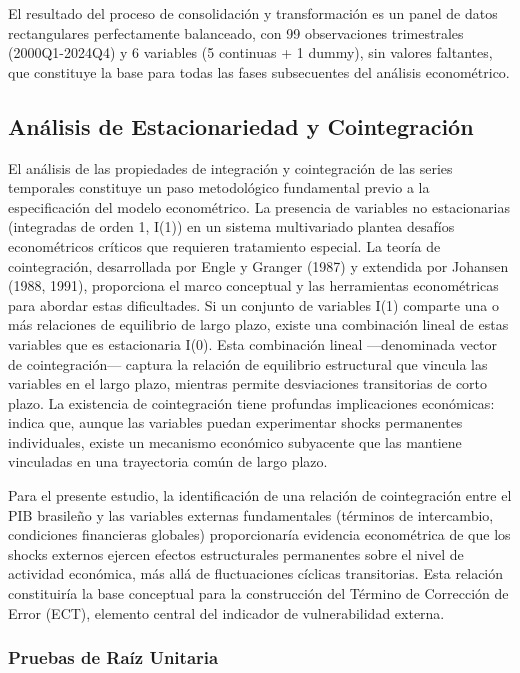 \documentclass[3p,11pt]{elsarticle}
\begin{document}
El resultado del proceso de consolidación y transformación es un panel de datos rectangulares perfectamente balanceado, con 99 observaciones trimestrales (2000Q1-2024Q4) y 6 variables (5 continuas + 1 dummy), sin valores faltantes, que constituye la base para todas las fases subsecuentes del análisis econométrico.

\subsection{Análisis de Estacionariedad y Cointegración}

El análisis de las propiedades de integración y cointegración de las series temporales constituye un paso metodológico fundamental previo a la especificación del modelo econométrico. La presencia de variables no estacionarias (integradas de orden 1, I(1)) en un sistema multivariado plantea desafíos econométricos críticos que requieren tratamiento especial. La teoría de cointegración, desarrollada por Engle y Granger (1987) y extendida por Johansen (1988, 1991), proporciona el marco conceptual y las herramientas econométricas para abordar estas dificultades. Si un conjunto de variables I(1) comparte una o más relaciones de equilibrio de largo plazo, existe una combinación lineal de estas variables que es estacionaria I(0). Esta combinación lineal ---denominada vector de cointegración--- captura la relación de equilibrio estructural que vincula las variables en el largo plazo, mientras permite desviaciones transitorias de corto plazo. La existencia de cointegración tiene profundas implicaciones económicas: indica que, aunque las variables puedan experimentar shocks permanentes individuales, existe un mecanismo económico subyacente que las mantiene vinculadas en una trayectoria común de largo plazo.

Para el presente estudio, la identificación de una relación de cointegración entre el PIB brasileño y las variables externas fundamentales (términos de intercambio, condiciones financieras globales) proporcionaría evidencia econométrica de que los shocks externos ejercen efectos estructurales permanentes sobre el nivel de actividad económica, más allá de fluctuaciones cíclicas transitorias. Esta relación constituiría la base conceptual para la construcción del Término de Corrección de Error (ECT), elemento central del indicador de vulnerabilidad externa.

\subsubsection{Pruebas de Raíz Unitaria}
\end{document}
